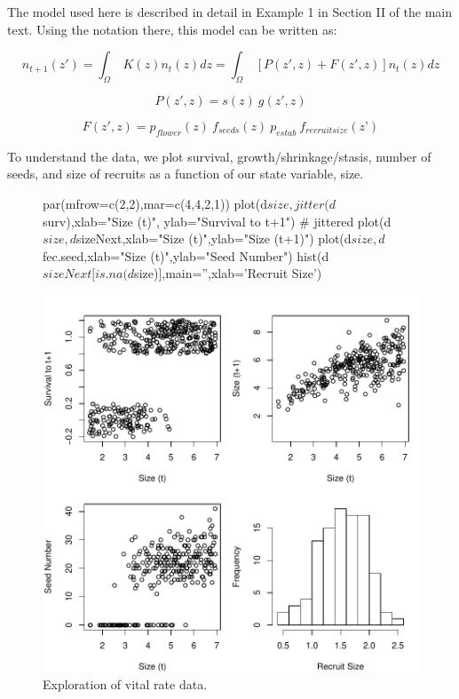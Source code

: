 \documentclass[11pt]{article}
\begin{document}
The model used here is described in detail in Example 1 in Section II of the main text. Using the notation there, this model can be written as:

\begin{equation}
n_{t+1}(z')=\int_\Omega \ K(z) n_{t}(z) dz =\int_\Omega \ [P(z',z) + F(z',z)] n_{t}(z) dz
\end{equation}

\begin{equation}
P(z',z) = s(z)\ g(z',z) 
\end{equation}

\begin{equation}
F(z',z) = p_{flower}(z)\ f_{seeds}(z)\ p_{estab}\ f_{recruit size}(z’)
\end{equation}

To understand the data, we plot survival, growth/shrinkage/stasis, number of seeds, and size of recruits as a function of our state variable, size.   

\begin{figure}[H]
\begin{center}
\begin{Schunk}
\begin{Sinput}
     par(mfrow=c(2,2),mar=c(4,4,2,1)) 
     plot(d$size,jitter(d$surv),xlab="Size (t)", ylab="Survival to t+1") # jittered 
     plot(d$size,d$sizeNext,xlab="Size (t)",ylab="Size (t+1)")  
     plot(d$size,d$fec.seed,xlab="Size (t)",ylab="Seed Number") 
     hist(d$sizeNext[is.na(d$size)],main='',xlab='Recruit Size')
\end{Sinput}
\end{Schunk}
\includegraphics{IPM_Guide_Appendix_A-fig1}

\caption{Exploration of vital rate data.}
\label{fig:figA1}
\end{center}
\end{figure}
\end{document}
